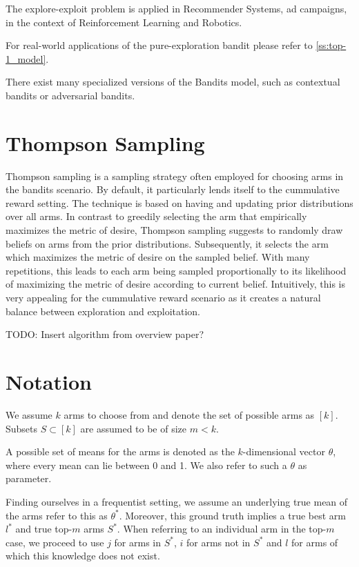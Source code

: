 The explore-exploit problem is applied in Recommender Systems, ad campaigns, in the context of Reinforcement Learning and Robotics.

For real-world applications of the pure-exploration bandit please refer to \ref{ss:top-1_model}.

There exist many specialized versions of the Bandits model, such as contextual bandits or adversarial bandits.

\section{Thompson Sampling}

Thompson sampling is a sampling strategy often employed for choosing arms in the bandits scenario. By default, it particularly lends itself to the cummulative reward setting. The technique is based on having and updating prior distributions over all arms. In contrast to greedily selecting the arm that empirically maximizes the metric of desire, Thompson sampling suggests to randomly draw beliefs on arms from the prior distributions. Subsequently, it selects the arm which maximizes the metric of desire on the sampled belief.
With many repetitions, this leads to each arm being sampled proportionally to its likelihood of maximizing the metric of desire according to current belief.
Intuitively, this is very appealing for the cummulative reward scenario as it creates a natural balance between exploration and exploitation.

TODO: Insert algorithm from overview paper?

\section{Notation}
We assume $k$ arms to choose from and denote the set of possible arms as $[k]$. Subsets $S \subset [k]$ are assumed to be of size $m < k$.

A possible set of means for the arms is denoted as the $k$-dimensional vector $\theta$, where every mean can lie between 0 and 1. We also refer to such a $\theta$ as parameter.

Finding ourselves in a frequentist setting, we assume an underlying true mean of the arms refer to this as $\theta^*$. Moreover, this ground truth implies a true best arm $l^*$ and true top-$m$ arms $S^*$. When referring to an individual arm in the top-$m$ case, we proceed to use $j$ for arms in $S^*$, $i$ for arms not in $S^*$ and $l$ for arms of which this knowledge does not exist.

